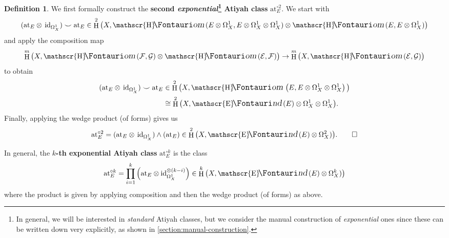\documentclass[11pt,fleqn]{article}
\theoremstyle{plain}
\theoremstyle{definition}
\newtheorem{definition}[theorem]{Definition}
\theoremstyle{remark}
\numberwithin{equation}{theorem}
\newcommand{\id}{\mathrm{id}}
\newcommand{\at}{\mathrm{at}}
\newcommand{\expat}[1]{\at^{\circ#1}}
\newcommand{\define}[1]{\textbf{#1}}
\DeclareMathOperator{\HH}{H}
\DeclareMathOperator{\sheafhom}{\mathscr{H}\textup{\kern -2.5pt {\large\Fontauri\slshape om}}\,}
\DeclareMathOperator{\sheafend}{\mathscr{E}\textup{\kern -2pt {\large\Fontauri\slshape nd}}\,}
\begin{document}
        \begin{definition}\label{definition:second-exponential-atiyah-class}
            We first formally construct the \define{second \emph{exponential}\footnote{In general, we will be interested in \emph{standard} Atiyah classes, but we consider the manual construction of \emph{exponential} ones since these can be written down very explicitly, as shown in \cref{section:manual-construction}.} Atiyah class} $\expat{2}_E$.
            We start with
            \begin{equation*}
                (\at_E\otimes\,\id_{\Omega_X^1})\smile\at_E \in \HH^2\big(X,\sheafhom(E\otimes\Omega_X^1,E\otimes\Omega_X^1\otimes\Omega_X^1)\otimes\sheafhom(E,E\otimes\Omega_X^1)\big)
            \end{equation*}
            and apply the composition map
            \begin{equation*}
                \HH^m\big(X,\sheafhom(\mathcal{F},\mathcal{G})\otimes\sheafhom(\mathcal{E},\mathcal{F})\big) \to \HH^m\big(X,\sheafhom(\mathcal{E},\mathcal{G})\big)
            \end{equation*}
            to obtain
            \begin{align*}
                (\at_E\otimes\,\id_{\Omega_X^1})\smile\at_E &\in \HH^2\big(X,\sheafhom\left(E,E\otimes\Omega_X^1\otimes\Omega_X^1\right)\big)\\
                &\cong \HH^2\big(X,\sheafend(E)\otimes\Omega_X^1\otimes\Omega_X^1\big).
            \end{align*}
            Finally, applying the wedge product (of forms) gives us
            \begin{equation*}
                \expat{2}_E=(\at_E\otimes\,\id_{\Omega_X^1})\wedge(\at_E) \in \HH^2\big(X,\sheafend(E)\otimes\Omega_X^2)\big).\qedhere
            \end{equation*}
            
            In general, the \define{$k$-th exponential Atiyah class} $\expat{k}_E$ is the class
            \begin{equation*}
                \expat{k}_E = \prod_{i=1}^k\left(\at_E\otimes\id_{\Omega_X^1}^{\otimes(k-i)}\right) \in \HH^k\big(X,\sheafend(E)\otimes\Omega_X^k)\big)
            \end{equation*}
            where the product is given by applying composition and then the wedge product (of forms) as above.
        \end{definition}
            
\end{document}
